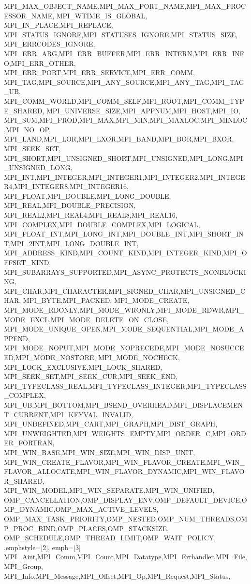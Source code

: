 {{    MPI_MAX_OBJECT_NAME,MPI_MAX_PORT_NAME,MPI_MAX_PROCESSOR_NAME,    
    MPI_WTIME_IS_GLOBAL, MPI_IN_PLACE,MPI_REPLACE,
    MPI_STATUS_IGNORE,MPI_STATUSES_IGNORE,MPI_STATUS_SIZE,
    MPI_ERRCODES_IGNORE,
    MPI_ERR_ARG,MPI_ERR_BUFFER,MPI_ERR_INTERN,MPI_ERR_INFO,MPI_ERR_OTHER,
    MPI_ERR_PORT,MPI_ERR_SERVICE,MPI_ERR_COMM,
    MPI_TAG,MPI_SOURCE,MPI_ANY_SOURCE,MPI_ANY_TAG,MPI_TAG_UB,
    MPI_COMM_WORLD,MPI_COMM_SELF,MPI_ROOT,MPI_COMM_TYPE_SHARED,
    MPI_UNIVERSE_SIZE,MPI_APPNUM,MPI_HOST,MPI_IO,
    MPI_SUM,MPI_PROD,MPI_MAX,MPI_MIN,MPI_MAXLOC,MPI_MINLOC,MPI_NO_OP,
    MPI_LAND,MPI_LOR,MPI_LXOR,MPI_BAND,MPI_BOR,MPI_BXOR,
    MPI_SEEK_SET,
    MPI_SHORT,MPI_UNSIGNED_SHORT,MPI_UNSIGNED,MPI_LONG,MPI_UNSIGNED_LONG,
    MPI_INT,MPI_INTEGER,MPI_INTEGER1,MPI_INTEGER2,MPI_INTEGER4,MPI_INTEGER8,MPI_INTEGER16,
    MPI_FLOAT,MPI_DOUBLE,MPI_LONG_DOUBLE,
    MPI_REAL,MPI_DOUBLE_PRECISION,
    MPI_REAL2,MPI_REAL4,MPI_REAL8,MPI_REAL16,
    MPI_COMPLEX,MPI_DOUBLE_COMPLEX,MPI_LOGICAL,
    MPI_FLOAT_INT,MPI_LONG_INT,MPI_DOUBLE_INT,MPI_SHORT_INT,MPI_2INT,MPI_LONG_DOUBLE_INT,
    MPI_ADDRESS_KIND,MPI_COUNT_KIND,MPI_INTEGER_KIND,MPI_OFFSET_KIND,
    MPI_SUBARRAYS_SUPPORTED,MPI_ASYNC_PROTECTS_NONBLOCKING,
    MPI_CHAR,MPI_CHARACTER,MPI_SIGNED_CHAR,MPI_UNSIGNED_CHAR,
    MPI_BYTE,MPI_PACKED, MPI_MODE_CREATE,
    MPI_MODE_RDONLY,MPI_MODE_WRONLY,MPI_MODE_RDWR,MPI_MODE_EXCL,MPI_MODE_DELETE_ON_CLOSE,
    MPI_MODE_UNIQUE_OPEN,MPI_MODE_SEQUENTIAL,MPI_MODE_APPEND,
    MPI_MODE_NOPUT,MPI_MODE_NOPRECEDE,MPI_MODE_NOSUCCEED,MPI_MODE_NOSTORE,
    MPI_MODE_NOCHECK, MPI_LOCK_EXCLUSIVE,MPI_LOCK_SHARED,
    MPI_SEEK_SET,MPI_SEEK_CUR,MPI_SEEK_END,
    MPI_TYPECLASS_REAL,MPI_TYPECLASS_INTEGER,MPI_TYPECLASS_COMPLEX,
    MPI_UB,MPI_BOTTOM,MPI_BSEND_OVERHEAD,MPI_DISPLACEMENT_CURRENT,MPI_KEYVAL_INVALID,
    MPI_UNDEFINED,MPI_CART,MPI_GRAPH,MPI_DIST_GRAPH,
    MPI_UNWEIGHTED,MPI_WEIGHTS_EMPTY,MPI_ORDER_C,MPI_ORDER_FORTRAN,
    MPI_WIN_BASE,MPI_WIN_SIZE,MPI_WIN_DISP_UNIT,
    MPI_WIN_CREATE_FLAVOR,MPI_WIN_FLAVOR_CREATE,MPI_WIN_FLAVOR_ALLOCATE,MPI_WIN_FLAVOR_DYNAMIC,MPI_WIN_FLAVOR_SHARED,
    MPI_WIN_MODEL,MPI_WIN_SEPARATE,MPI_WIN_UNIFIED,
    OMP_CANCELLATION,OMP_DISPLAY_ENV,OMP_DEFAULT_DEVICE,OMP_DYNAMIC,OMP_MAX_ACTIVE_LEVELS,
    OMP_MAX_TASK_PRIORITY,OMP_NESTED,OMP_NUM_THREADS,OMP_PROC_BIND,OMP_PLACES,OMP_STACKSIZE,
    OMP_SCHEDULE,OMP_THREAD_LIMIT,OMP_WAIT_POLICY,
  },emphstyle={[2]\color{green!40!black}},
  emph={[3] %
    MPI_Aint,MPI_Comm,MPI_Count,MPI_Datatype,MPI_Errhandler,MPI_File,MPI_Group,
    MPI_Info,MPI_Message,MPI_Offset,MPI_Op,MPI_Request,MPI_Status,
}}
